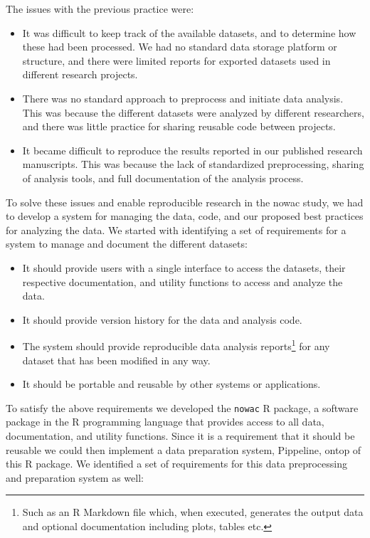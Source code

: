 The issues with the previous practice were: 
\begin{itemize} 
    \item It was difficult to keep track of the available datasets, and to
        determine how these had been processed. We had no standard data storage
        platform or structure, and there were limited reports for exported
        datasets used in different research projects.
        
    \item There was no standard approach to preprocess and initiate data
        analysis. This was because the different datasets were analyzed by
        different researchers, and there was little practice for sharing
        reusable code between projects. 

    \item It became difficult to reproduce the results reported in our published
        research manuscripts. This was because the lack of standardized
        preprocessing, sharing of analysis tools, and full documentation of the
        analysis process. 
        
\end{itemize} 

To solve these issues and enable reproducible research in the \gls{nowac} study,
we had to develop a system for managing the data, code, and our proposed best
practices for analyzing the data. We started with identifying a set of
requirements for a system to manage and document the different datasets: 

\begin{itemize} 
    \item It should provide users with a single interface to access the
        datasets, their respective documentation, and utility functions to
        access and analyze the data.
    \item It should provide version history for the data and analysis code. 
    \item The system should provide reproducible data analysis
        reports\footnote{Such as an R Markdown file which, when executed,
        generates the output data and optional documentation including plots,
        tables etc.} for any dataset that has been modified in any way. 
    \item It should be portable and reusable by other systems or applications. 
\end{itemize} 

To satisfy the above requirements we developed the \texttt{nowac} R package, a
software package in the R programming language that provides access to all data,
documentation, and utility functions. Since it is a requirement that it should
be reusable we could then implement a data preparation system, Pippeline, ontop
of this R package. We identified a set of requirements for this data
preprocessing and preparation system as well: 

